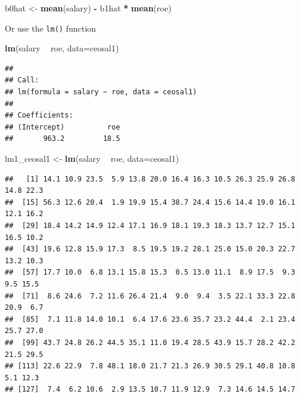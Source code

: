 \documentclass[]{book}
\newenvironment{Shaded}{\begin{snugshade}}{\end{snugshade}}
\newcommand{\DataTypeTok}[1]{\textcolor[rgb]{0.13,0.29,0.53}{#1}}
\newcommand{\KeywordTok}[1]{\textcolor[rgb]{0.13,0.29,0.53}{\textbf{#1}}}
\newcommand{\NormalTok}[1]{#1}
\newcommand{\OperatorTok}[1]{\textcolor[rgb]{0.81,0.36,0.00}{\textbf{#1}}}
\newcommand{\StringTok}[1]{\textcolor[rgb]{0.31,0.60,0.02}{#1}}
\begin{document}
\begin{Shaded}
\begin{Highlighting}[]
\NormalTok{b0hat <-}\StringTok{ }\KeywordTok{mean}\NormalTok{(salary) }\OperatorTok{-}\StringTok{ }\NormalTok{b1hat }\OperatorTok{*}\StringTok{ }\KeywordTok{mean}\NormalTok{(roe)}
\end{Highlighting}
\end{Shaded}

Or use the \texttt{lm()} function

\begin{Shaded}
\begin{Highlighting}[]
\KeywordTok{lm}\NormalTok{(salary }\OperatorTok{~}\StringTok{ }\NormalTok{roe, }\DataTypeTok{data=}\NormalTok{ceosal1)}
\end{Highlighting}
\end{Shaded}

\begin{verbatim}
## 
## Call:
## lm(formula = salary ~ roe, data = ceosal1)
## 
## Coefficients:
## (Intercept)          roe  
##       963.2         18.5
\end{verbatim}

\begin{Shaded}
\begin{Highlighting}[]
\NormalTok{lm1_ceosal1 <-}\StringTok{ }\KeywordTok{lm}\NormalTok{(salary }\OperatorTok{~}\StringTok{ }\NormalTok{roe, }\DataTypeTok{data=}\NormalTok{ceosal1) }
\end{Highlighting}
\end{Shaded}

\begin{Shaded}
\end{Shaded}

\begin{verbatim}
##   [1] 14.1 10.9 23.5  5.9 13.8 20.0 16.4 16.3 10.5 26.3 25.9 26.8 14.8 22.3
##  [15] 56.3 12.6 20.4  1.9 19.9 15.4 38.7 24.4 15.6 14.4 19.0 16.1 12.1 16.2
##  [29] 18.4 14.2 14.9 12.4 17.1 16.9 18.1 19.3 18.3 13.7 12.7 15.1 16.5 10.2
##  [43] 19.6 12.8 15.9 17.3  8.5 19.5 19.2 28.1 25.0 15.0 20.3 22.7 13.2 10.3
##  [57] 17.7 10.0  6.8 13.1 15.8 15.3  0.5 13.0 11.1  8.9 17.5  9.3  9.5 15.5
##  [71]  8.6 24.6  7.2 11.6 26.4 21.4  9.0  9.4  3.5 22.1 33.3 22.8 20.9  6.7
##  [85]  7.1 11.8 14.0 10.1  6.4 17.6 23.6 35.7 23.2 44.4  2.1 23.4 25.7 27.0
##  [99] 43.7 24.8 26.2 44.5 35.1 11.0 19.4 28.5 43.9 15.7 28.2 42.2 21.5 29.5
## [113] 22.6 22.9  7.8 48.1 18.0 21.7 21.3 26.9 30.5 29.1 40.8 10.8  5.1 12.3
## [127]  7.4  6.2 10.6  2.9 13.5 10.7 11.9 12.9  7.3 14.6 14.5 14.7
\end{verbatim}
\end{document}
